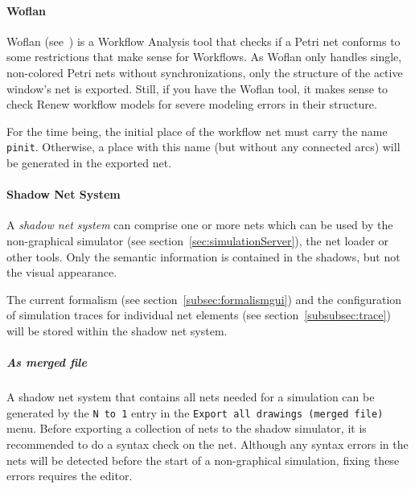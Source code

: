 \paragraph{Woflan}

Woflan (see~\cite{Woflan98})
is a Workflow Analysis tool that checks if a Petri net
conforms to some restrictions that make sense for Workflows.
As Woflan only handles single, non-colored Petri nets without
synchronizations, only the structure of the active window's net
is exported. Still, if you have the Woflan tool, it makes sense to check
Renew workflow models for severe modeling errors in their structure.

For the time being, the initial place of the workflow net must
carry the name \texttt{pinit}. Otherwise, a place with this name
(but without any connected arcs) will be generated in the
exported net.

%

\paragraph{Shadow Net System}\label{subsec:expshadow}

A \emph{shadow net system} can comprise one or more nets
which can be used by the non-graphical simulator (see
section~\ref{sec:simulationServer}), the net loader or other
tools.
Only the
semantic information is contained in the shadows, but not
the visual appearance.

The current formalism (see section~\ref{subsec:formalismgui}) and the
configuration of simulation traces for individual net elements (see
section~\ref{subsubsec:trace}) will be stored within the shadow net
system.

\subparagraph{As merged file}
A shadow net system that contains all nets needed for a
simulation can be generated by the \texttt{N to 1} entry in the
\texttt{Export all drawings (merged file)} menu.
Before exporting a collection of nets to the shadow simulator, it
is recommended to do a syntax check on the net. 
Although any syntax errors in the nets will be detected before the
start of a non-graphical simulation, fixing these errors requires the
editor.

